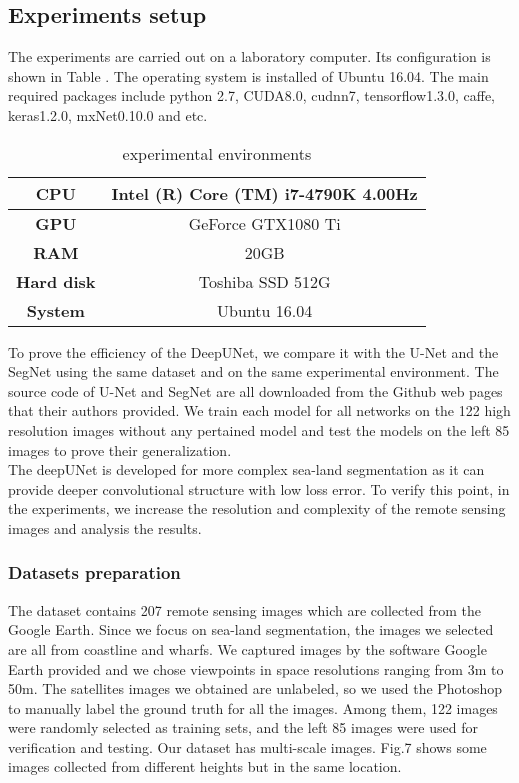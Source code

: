 \documentclass[conference]{IEEEtran}
\begin{document}
\subsection{Experiments setup}

The experiments are carried out on a laboratory computer. Its configuration is shown in Table \uppercase\expandafter{}. The operating system is installed of Ubuntu 16.04. The main required packages include python 2.7, CUDA8.0, cudnn7, tensorflow1.3.0, caffe, keras1.2.0, mxNet0.10.0 and etc.

\begin{table}[h]
\caption{experimental environments}
\centering
\begin{tabular}{|c|c|}
\hline
\textbf{CPU} & Intel (R) Core (TM) i7-4790K 4.00Hz \\
\hline
\textbf{GPU} & GeForce GTX1080 Ti \\
\hline
\textbf{RAM} & 20GB \\
\hline
\textbf{Hard disk} & Toshiba SSD 512G \\
\hline
\textbf{System} & Ubuntu 16.04 \\
\hline
\end{tabular}
\label{table2}
\end{table}

To prove the efficiency of the DeepUNet, we compare it with the U-Net and the SegNet using the same dataset and on the same experimental environment. The source code of U-Net and SegNet are all downloaded from the Github web pages that their authors provided. We train each model for all networks on the 122 high resolution images without any pertained model and test the models on the left 85 images to prove their generalization.\\

The deepUNet is developed for more complex sea-land segmentation as it can provide deeper convolutional structure with low loss error. To verify this point, in the experiments, we increase the resolution and complexity of the remote sensing images and analysis the results.

\subsubsection{Datasets preparation}

The dataset contains 207 remote sensing images which are collected from the Google Earth. Since we focus on sea-land segmentation, the images we selected are all from coastline and wharfs. We captured images by the software Google Earth provided and we chose viewpoints in space resolutions ranging from 3m to 50m. The satellites images we obtained are unlabeled, so we used the Photoshop to manually label the ground truth for all the images. Among them, 122 images were randomly selected as training sets, and the left 85 images were used for verification and testing. Our dataset has multi-scale images. Fig.7 shows some images collected from different heights but in the same location.
\end{document}

